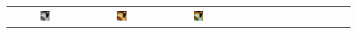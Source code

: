 \documentclass[10pt,twocolumn,letterpaper]{article}
\def\acollumsize{0.14\textwidth}
\begin{document}
\begin{figure}[t!]
\begin{center}
\begin{tabular}{ ccccccccccccc }
\includegraphics[width=\acollumsize]{img/result/23_in.JPEG}&
\includegraphics[width=\acollumsize]{img/result/23.png}&
\includegraphics[width=\acollumsize]{img/result/23_gt.JPEG}& &&


\end{tabular}
\end{center}
\end{figure}
\end{document}
